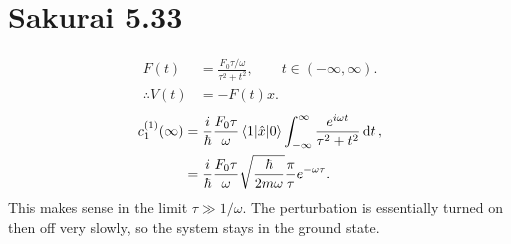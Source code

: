 \documentclass[
a4paper,
10pt,
twoside,
]{article}
\begin{document}
\section{Sakurai 5.33}\label{sec: IV}


\begin{align}
	F(t) &= \frac{F_0 \tau/\omega}{\tau^2+t^2}, \qquad t \in (-\infty,\infty).\\
	\therefore V(t) &= -F(t)x.
\end{align}
\begin{align}
	c_1^{(1)}(\infty)
	&= \frac{i}{\hbar} \frac{F_0 \tau}{\omega} \mel*{1}{\hat{x}}{0}\int_{-\infty}^\infty \frac{e^{i\omega t}}{\tau^2+t^2} \dd{t},\\
	&= \frac{i}{\hbar} \frac{F_0 \tau}{\omega} \sqrt{\frac{\hbar}{2m\omega}} \frac{\pi}{\tau}e^{-\omega \tau}.
\end{align}
This makes sense in the limit $\tau \gg 1/\omega$.
The perturbation is essentially turned on then off very slowly, so the system stays in the ground state.


\stopmcols
\end{document}
